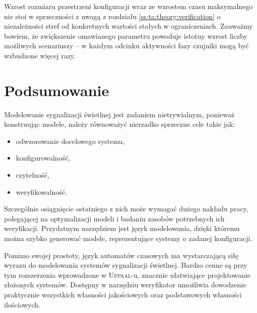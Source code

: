\documentclass{pracamgr}
\newcommand{\upp}{\textsc{Uppaal}}
\theoremstyle{plain}
\begin{document}
Wzrost rozmiaru przestrzeni konfiguracji wraz ze wzrostem czasu
maksymalnego nie stoi w sprzeczności z uwagą z rozdziału
\ref{ss:ta:theory:verification} o niezależności stref od
konkretnych wartości stałych w ograniczeniach. Zauważmy bowiem, że
zwiększenie omawianego parametru powoduje istotny wzrost liczby
możliwych scenariuszy -- w każdym odcinku aktywności fazy czujniki
mogą być wzbudzone więcej razy.

\chapter*{Podsumowanie}
Modelowanie sygnalizacji świetlnej jest zadaniem nietrywialnym,
ponieważ konstruując modele, należy równoważyć nierzadko sprzeczne
cele takie jak:
\begin{itemize}
  \item odwzorowanie docelowego systemu,
  \item konfigurowalność,
  \item czytelność,
  \item weryfikowalność.
\end{itemize}
Szczególnie osiągnięcie ostatniego z nich może wymagać dużego nakładu
pracy, polegającej na optymalizacji modeli i badaniu zasobów
potrzebnych ich weryfikacji. Przydatnym narzędziem jest język
modelowania, dzięki któremu można szybko generować modele,
reprezentujące systemy o zadanej konfiguracji.

Pomimo swojej prostoty, język automatów czasowych ma wystarczającą
siłę wyrazu do modelowania systemów sygnalizacji
świetlnej. Bardzo cenne są przy tym rozszerzenia wprowadzone w \upp-u,
znacznie ułatwiające projektowanie złożonych systemów. Dostępny w
narzędziu weryfikator umożliwia dowodzenie praktycznie wszystkich
własności jakościowych oraz podstawowych własności ilościowych.




{}



\appendix
\end{document}
